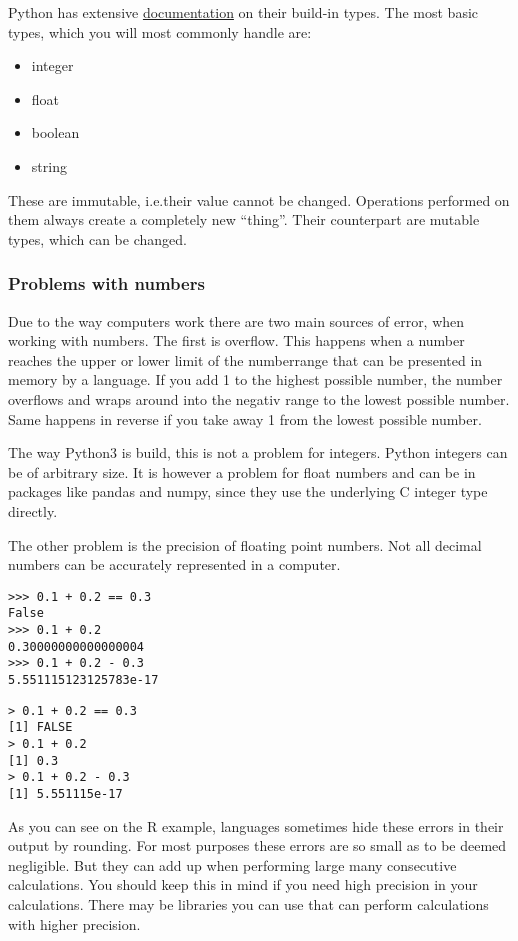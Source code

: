 \documentclass{article}
\begin{document}
Python has extensive \href{https://docs.python.org/3/library/stdtypes.html}{documentation}
on their build-in types.
The most basic types, which you will most commonly handle are:

\begin{itemize}
    \item integer
    \item float
    \item boolean
    \item string
\end{itemize}

These are immutable, i.e.\@ their value cannot be changed.
Operations performed on them always create a completely new ``thing''.
Their counterpart are mutable types, which can be changed.

\subsubsection{Problems with numbers}

Due to the way computers work there are two main sources of error, when working
with numbers.
The first is overflow.
This happens when a number reaches the upper or lower limit of the numberrange
that can be presented in memory by a language.
If you add 1 to the highest possible number, the number overflows and wraps around
into the negativ range to the lowest possible number.
Same happens in reverse if you take away 1 from the lowest possible number.

The way Python3 is build, this is not a problem for integers.
Python integers can be of arbitrary size.
It is however a problem for float numbers and can be in packages like pandas
and numpy, since they use the underlying C integer type directly.

The other problem is the precision of floating point numbers.
Not all decimal numbers can be accurately represented in a computer.


\begin{lstlisting}[title={Precision error in Python}]
>>> 0.1 + 0.2 == 0.3
False
>>> 0.1 + 0.2
0.30000000000000004
>>> 0.1 + 0.2 - 0.3
5.551115123125783e-17
\end{lstlisting}

\begin{lstlisting}[title={Precision error in R}]
> 0.1 + 0.2 == 0.3
[1] FALSE
> 0.1 + 0.2
[1] 0.3
> 0.1 + 0.2 - 0.3
[1] 5.551115e-17
\end{lstlisting}

As you can see on the R example, languages sometimes hide these errors in their
output by rounding.
For most purposes these errors are so small as to be deemed negligible.
But they can add up when performing large many consecutive calculations.
You should keep this in mind if you need high precision in your calculations.
There may be libraries you can use that can perform calculations with higher
precision.
\end{document}
